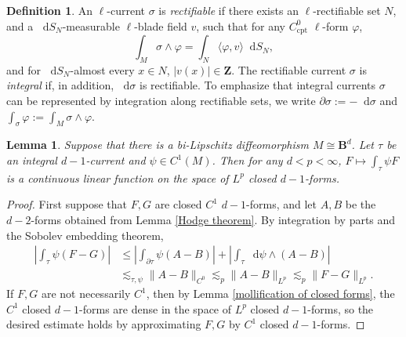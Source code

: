 \documentclass[reqno,11pt]{amsart}
\newcommand{\ZZ}{\mathbf{Z}}
\newcommand{\Ball}{\mathbf{B}}
\newcommand*\dif{\mathop{}\!\mathrm{d}}
\newcommand{\dfn}[1]{\emph{#1}\index{#1}}
\newcommand{\cpt}{\mathrm{cpt}}
\newtheorem{lemma}[theorem]{Lemma}
\theoremstyle{definition}
\newtheorem{definition}[theorem]{Definition}
\numberwithin{equation}{section}
\begin{document}
\begin{definition}
An $\ell$-current $\sigma$ is \dfn{rectifiable} if there exists an $\ell$-rectifiable set $N$, and a $\dif S_N$-measurable $\ell$-blade field $v$, such that for any $C^0_\cpt$ $\ell$-form $\varphi$,
$$\int_M \sigma \wedge \varphi = \int_N \langle \varphi, v\rangle \dif S_N,$$
and for $\dif S_N$-almost every $x \in N$, $|v(x)| \in \ZZ$.
The rectifiable current $\sigma$ is \dfn{integral} if, in addition, $\dif \sigma$ is rectifiable.
To emphasize that integral currents $\sigma$ can be represented by integration along rectifiable sets, we write $\partial \sigma := -\dif \sigma$ and $\int_\sigma \varphi := \int_M \sigma \wedge \varphi$.
\end{definition}

\begin{lemma}\label{local trace theorem}
Suppose that there is a bi-Lipschitz diffeomorphism $M \cong \Ball^d$.
Let $\tau$ be an integral $d - 1$-current and $\psi \in C^1(M)$.
Then for any $d < p < \infty$, $F \mapsto \int_\tau \psi F$ is a continuous linear function on the space of $L^p$ closed $d - 1$-forms.
\end{lemma}
\begin{proof}
First suppose that $F, G$ are closed $C^1$ $d - 1$-forms, and let $A, B$ be the $d - 2$-forms obtained from Lemma \ref{Hodge theorem}.
By integration by parts and the Sobolev embedding theorem,
\begin{align*}
	\left|\int_\tau \psi(F - G)\right| 
	&\leq \left|\int_{\partial \tau} \psi (A - B)\right| + \left|\int_\tau \dif \psi \wedge (A - B)\right| \\
	&\lesssim_{\tau, \psi} \|A - B\|_{C^0} \lesssim_p \|A - B\|_{L^p} \lesssim_p \|F - G\|_{L^p}.
\end{align*}
If $F, G$ are not necessarily $C^1$, then by Lemma \ref{mollification of closed forms}, the $C^1$ closed $d - 1$-forms are dense in the space of $L^p$ closed $d - 1$-forms, so the desired estimate holds by approximating $F, G$ by $C^1$ closed $d - 1$-forms.
\end{proof}
\end{document}
